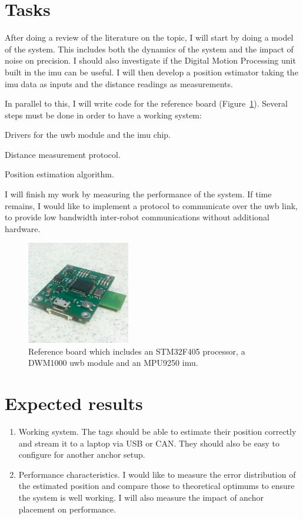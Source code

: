 \documentclass[a4paper,twocolumn]{article}
\begin{document}
\section{Tasks}

After doing a review of the literature on the topic, I will start by doing a model of the system.
This includes both the dynamics of the system and the impact of noise on precision.
I should also investigate if the Digital Motion Processing unit built in the \gls{imu} can be useful.
I will then develop a position estimator taking the \gls{imu} data as inputs and the distance readings as measurements.

In parallel to this, I will write code for the reference board (Figure~\ref{fig:board}).
Several steps must be done in order to have a working system:
\begin{inparaenum}
    \item Drivers for the \gls{uwb} module and the \gls{imu} chip.
    \item Distance measurement protocol.
    \item Position estimation algorithm.
\end{inparaenum}

I will finish my work by measuring the performance of the system.
If time remains, I would like to implement a protocol to communicate over the \gls{uwb} link, to provide low bandwidth inter-robot communications without additional hardware.

\begin{figure}[h!]
    \centering
    \includegraphics[width=0.4\textwidth]{figures/board}
    \caption{Reference board which includes an STM32F405 processor, a DWM1000 \gls{uwb} module and an MPU9250 \gls{imu}.}
    \label{fig:board}
\end{figure}

\section{Expected results}

\begin{enumerate}
    \item Working system.
        The tags should be able to estimate their position correctly and stream it to a laptop via USB or CAN.
        They should also be easy to configure for another anchor setup.
    \item Performance characteristics.
        I would like to measure the error distribution of the estimated position and compare those to theoretical optimums to ensure the system is well working.
        I will also measure the impact of anchor placement on performance.
\end{enumerate}
\end{document}
